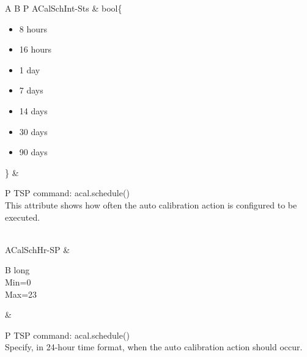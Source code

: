 \documentclass[openany]{article}
\begin{document}
\begin{longtable}{A B P}
		ACalSchInt-Sts & bool\{\begin{itemize}[noitemsep]
					\small
					\item[] 8 hours
					\item[] 16 hours
					\item[] 1 day
					\item[] 7 days
					\item[] 14 days
					\item[] 30 days
					\item[] 90 days
				\end{itemize}\} & 
				\begin{tabular}{P}
					TSP command: acal.schedule() \\
					This attribute shows how often the auto calibration action is configured to be executed.
				\end{tabular} \\ \hline
		ACalSchHr-SP & \begin{tabular}{B}
					long \\
					Min=0 \\
					Max=23
				\end{tabular} & 
				\begin{tabular}{P}
					TSP command: acal.schedule() \\
					Specify, in 24-hour time format, when the auto calibration action should occur.
				\end{tabular} \\


\end{longtable}
\end{document}
